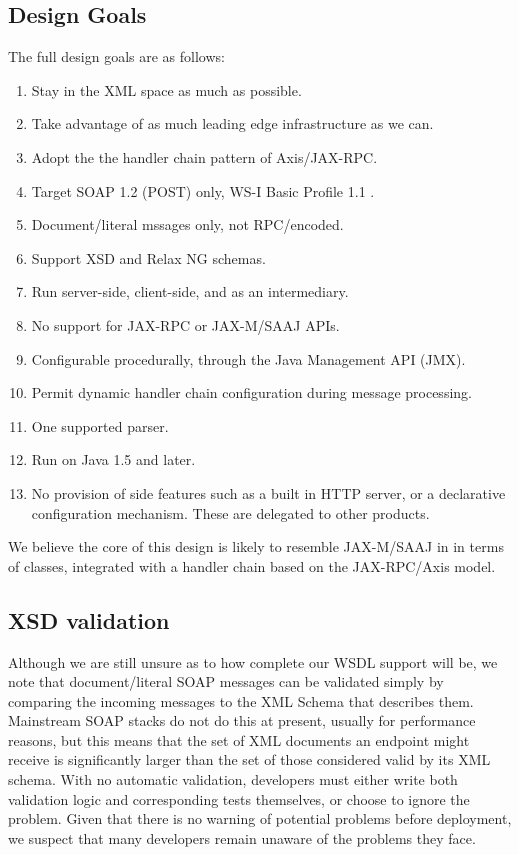 \subsection{Design Goals}
\label{alpine:design}

The full design goals are as follows:

\begin{enumerate}

\item Stay in the XML space as much as possible.
\item Take advantage of as much leading edge infrastructure as we can.
\item Adopt the the handler chain pattern of Axis/JAX-RPC.
\item Target SOAP 1.2 (POST) only, WS-I Basic Profile 1.1 \cite{spec:WSI-11}.
\item Document/literal mssages only, not RPC/encoded.
\item Support XSD and Relax NG schemas.
\item Run server-side, client-side, and as an intermediary. 
\item No support for JAX-RPC or JAX-M/SAAJ APIs.
\item Configurable procedurally, through the Java Management API (JMX).
\item Permit dynamic handler chain configuration during message processing.
\item One supported parser. %
\item Run on Java 1.5 and later.

\item No provision of side features such as a built in HTTP server, or
a declarative configuration mechanism. These are delegated to other products.
\end{enumerate}

We believe the core of this design is likely to resemble JAX-M/SAAJ in
in terms of classes, integrated with a handler chain based on the
JAX-RPC/Axis model.

\subsection{XSD validation}
\label{alpine:validation}

Although we are still unsure as to how complete our WSDL support will be, we
note that document/literal SOAP messages can be validated simply by comparing
the incoming messages to the XML Schema that describes them. Mainstream SOAP
stacks do not do this at present, usually for performance reasons, but this 
means that the set of XML documents an endpoint might receive is significantly 
larger than the set of those considered valid by its XML schema. With no automatic
validation, developers must either write both validation logic and corresponding
tests themselves, or choose to ignore the problem. Given that there is no warning 
of potential problems before deployment, we suspect that many developers remain 
unaware of the problems they face.

